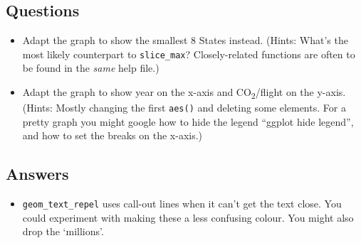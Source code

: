 \documentclass[
]{book}
\providecommand{\tightlist}{%
  \setlength{\itemsep}{0pt}\setlength{\parskip}{0pt}}
\begin{document}
\hypertarget{questions-2}{%
\subsection{Questions}\label{questions-2}}

\begin{itemize}
\tightlist
\item
  Adapt the graph to show the smallest 8 States instead. (Hints: What's the most likely counterpart to \texttt{slice\_max}? Closely-related functions are often to be found in the \emph{same} help file.)
\item
  Adapt the graph to show year on the x-axis and CO\textsubscript{2}/flight on the y-axis. (Hints: Mostly changing the first \texttt{aes()} and deleting some elements. For a pretty graph you might google how to hide the legend ``ggplot hide legend'', and how to set the breaks on the x-axis.)
\end{itemize}

\hypertarget{answers-2}{%
\subsection{Answers}\label{answers-2}}

\begin{itemize}
\tightlist
\item
  \texttt{geom\_text\_repel} uses call-out lines when it can't get the text close. You could experiment with making these a less confusing colour. You might also drop the `millions'.
\end{itemize}
\end{document}
